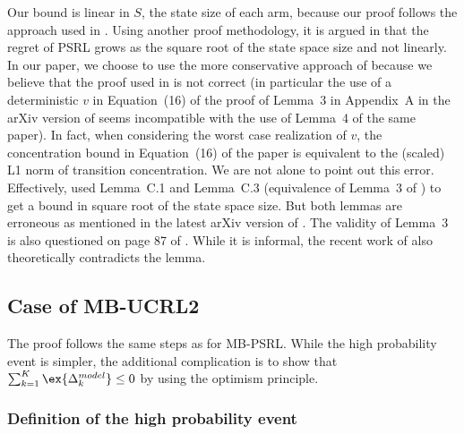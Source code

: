 Our bound is linear in $S$, the state size of each arm, because our proof follows the approach used in \cite{osband2013more}. Using another proof methodology, it is argued in \cite{osband2017posterior} that the regret of PSRL grows as the square root of the state space size and not linearly. In our paper, we choose to use the more conservative approach of \cite{osband2013more} because we believe that the proof used in \cite{osband2017posterior} is not correct (in particular the use of a deterministic $v$ in Equation~(16) of the proof of Lemma~3 in Appendix~A in the arXiv version of \cite{osband2017posterior} seems incompatible with the use of Lemma~4 of the same paper).
In fact, when considering the worst case realization of $v$, the concentration bound in Equation~(16) of the paper is equivalent to the (scaled) L1 norm of transition concentration.
We are not alone to point out this error. Effectively, \cite{agrawal2017posterior} used Lemma~C.1 and Lemma~C.3 (equivalence of Lemma~3 of \cite{osband2017posterior}) to get a bound in square root of the state space size. But both lemmas are erroneous as mentioned in the latest arXiv version of \cite{agrawal2017posterior}. The validity of Lemma~3 is also questioned on page 87 of \cite{fruit2019exploration}. While it is informal, the recent work of \cite{qian2020concentration} also theoretically contradicts the lemma.

\subsection{Case of MB-UCRL2}
\label{ssec:proof_UCRL2}

The proof follows the same steps as for MB-PSRL. While the high probability event is simpler, the additional complication is to show that $\sum_{k=1}^K\ex{\Delta^{model}_k}\le0$ by using the optimism principle. 

\subsubsection{Definition of the high probability event} 

